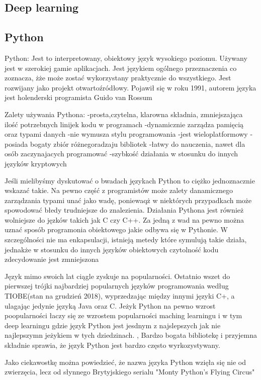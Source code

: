 \documentclass[a4paper,12pt,twoside,openany]{report}
\begin{document}
\subsection{Deep learning}

\subsection{Python}
Python:
Jest to interpretowany, obiektowy język wysokiego poziomu. Używany jest w szerokiej gamie  aplikacjach. Jest językiem ogólnego przeznaczenia co zoznacza, żże może zostać wykorzystany praktycznie do wszystkiego. Jest rozwijany jako projekt otwartoźródłowy. Pojawił się w roku 1991, autorem języka jest holenderski programista Guido van Rossum

Zalety używania Pythona:
-prosta,czytelna, klarowna składnia, zmniejszająca ilość potrzebnych linijek kodu w programach
-dynamicznie zarządza pamięcią oraz typami danych
-nie wymusza stylu programowania
-jest wieloplatformowy
-posiada bogaty zbiór różnegoradzaju bibliotek
-łatwy do nauczenia, nawet dla osób zaczynajacych programować
-szybkość działania w stosunku do innych języków kryptowych

Jeśli mielibyśmy dyskutować o bwadach językach Python to ciężko jednoznacznie wskazać takie. Na pewno część z programistów może zalety danamicznego zarządzania typami unać jako wadę, poniewaqż w niektórych przypadkach może spowodować błedy trudniejsze do znalezienia. Działania Pythona jest również wolniejsze do jęzków takich jak C czy C++.  Za jedną z wad na pewno można uznać sposób programonia obiektowego jakie odbywa się w Pythonie. W szczególności nie ma enkapsulacji, istnieją metedy które symulują takie działa, jednakże w stosunku do innych języków  obiektowych czytolność kodu zdecydowanie jest zmniejszona

Język mimo swoich lat ciągle zyskuje na popularności. Ostatnio wszet do pierwszej trójki najbardziej popularnych języków programowania według TIOBE(stan na grudzień 2018), wyprzedzając między innymi języki C+, a ulagając jedynie języką Java oraz C. Jeżyk Python na pewno wzrost poopularności łaczy się ze wzrostem popularności maching learningu i w tym deep learningu gdzie język Python jest jesdnym z najslepszych jak nie najlepszymn jeżykiem w tych dziedzinach. , Bardzo bogata bibliotekę i przyjemna składnie sprawia, że język Python jest bardzo często wyrkozystywany.  

Jako ciekawostkę można powiedzieć, że nazwa języka Python wzięła się nie od zwierzęcia, lecz od słynnego Brytyjskiego serialu "Monty Python’s Flying Circus"
\end{document}
